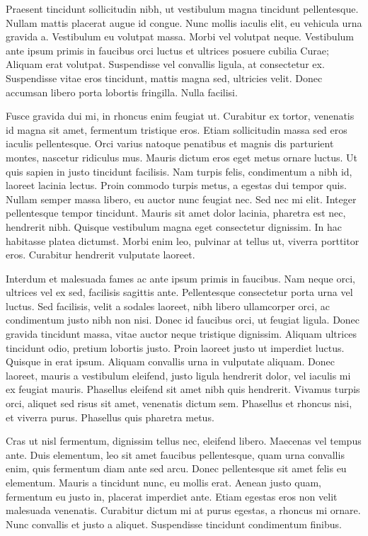 Praesent tincidunt sollicitudin nibh, ut vestibulum magna tincidunt pellentesque. Nullam mattis placerat augue id congue. Nunc mollis iaculis elit, eu vehicula urna gravida a. Vestibulum eu volutpat massa. Morbi vel volutpat neque. Vestibulum ante ipsum primis in faucibus orci luctus et ultrices posuere cubilia Curae; Aliquam erat volutpat. Suspendisse vel convallis ligula, at consectetur ex. Suspendisse vitae eros tincidunt, mattis magna sed, ultricies velit. Donec accumsan libero porta lobortis fringilla. Nulla facilisi.

Fusce gravida dui mi, in rhoncus enim feugiat ut. Curabitur ex tortor, venenatis id magna sit amet, fermentum tristique eros. Etiam sollicitudin massa sed eros iaculis pellentesque. Orci varius natoque penatibus et magnis dis parturient montes, nascetur ridiculus mus. Mauris dictum eros eget metus ornare luctus. Ut quis sapien in justo tincidunt facilisis. Nam turpis felis, condimentum a nibh id, laoreet lacinia lectus. Proin commodo turpis metus, a egestas dui tempor quis. Nullam semper massa libero, eu auctor nunc feugiat nec. Sed nec mi elit. Integer pellentesque tempor tincidunt. Mauris sit amet dolor lacinia, pharetra est nec, hendrerit nibh. Quisque vestibulum magna eget consectetur dignissim. In hac habitasse platea dictumst. Morbi enim leo, pulvinar at tellus ut, viverra porttitor eros. Curabitur hendrerit vulputate laoreet.

Interdum et malesuada fames ac ante ipsum primis in faucibus. Nam neque orci, ultrices vel ex sed, facilisis sagittis ante. Pellentesque consectetur porta urna vel luctus. Sed facilisis, velit a sodales laoreet, nibh libero ullamcorper orci, ac condimentum justo nibh non nisi. Donec id faucibus orci, ut feugiat ligula. Donec gravida tincidunt massa, vitae auctor neque tristique dignissim. Aliquam ultrices tincidunt odio, pretium lobortis justo. Proin laoreet justo ut imperdiet luctus. Quisque in erat ipsum. Aliquam convallis urna in vulputate aliquam. Donec laoreet, mauris a vestibulum eleifend, justo ligula hendrerit dolor, vel iaculis mi ex feugiat mauris. Phasellus eleifend sit amet nibh quis hendrerit. Vivamus turpis orci, aliquet sed risus sit amet, venenatis dictum sem. Phasellus et rhoncus nisi, et viverra purus. Phasellus quis pharetra metus.

Cras ut nisl fermentum, dignissim tellus nec, eleifend libero. Maecenas vel tempus ante. Duis elementum, leo sit amet faucibus pellentesque, quam urna convallis enim, quis fermentum diam ante sed arcu. Donec pellentesque sit amet felis eu elementum. Mauris a tincidunt nunc, eu mollis erat. Aenean justo quam, fermentum eu justo in, placerat imperdiet ante. Etiam egestas eros non velit malesuada venenatis. Curabitur dictum mi at purus egestas, a rhoncus mi ornare. Nunc convallis et justo a aliquet. Suspendisse tincidunt condimentum finibus.


